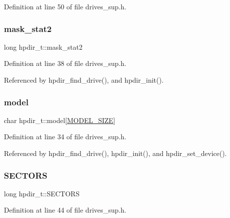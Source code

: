 Definition at line 50 of file drives\+\_\+sup.\+h.

\mbox{\label{structhpdir__t_a788d1032b8ff695092f9e4ff4cf36adf}} 
\subsubsection{\texorpdfstring{mask\+\_\+stat2}{mask\_stat2}}
{\footnotesize\ttfamily long hpdir\+\_\+t\+::mask\+\_\+stat2}



Definition at line 38 of file drives\+\_\+sup.\+h.



Referenced by hpdir\+\_\+find\+\_\+drive(), and hpdir\+\_\+init().

\mbox{\label{structhpdir__t_a3855aafd93d84611573376653f9cd2c0}} 
\subsubsection{\texorpdfstring{model}{model}}
{\footnotesize\ttfamily char hpdir\+\_\+t\+::model\mbox{[}\hyperlink{drives__sup_8h_a3f11d81c1e6d925611a9bdd5115064a0}{M\+O\+D\+E\+L\+\_\+\+S\+I\+ZE}\mbox{]}}



Definition at line 34 of file drives\+\_\+sup.\+h.



Referenced by hpdir\+\_\+find\+\_\+drive(), hpdir\+\_\+init(), and hpdir\+\_\+set\+\_\+device().

\mbox{\label{structhpdir__t_a6ee950a83086b3872cfd8fab8d809bf2}} 
\subsubsection{\texorpdfstring{S\+E\+C\+T\+O\+RS}{SECTORS}}
{\footnotesize\ttfamily long hpdir\+\_\+t\+::\+S\+E\+C\+T\+O\+RS}



Definition at line 44 of file drives\+\_\+sup.\+h.



